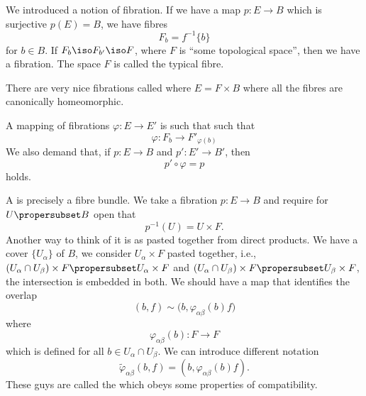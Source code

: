 
We introduced a notion of fibration. If we have a map $p\colon
E\to B$ which is surjective $p(E)=B$, we have fibres 
\begin{equation}
F_{b}=f^{-1}\{b\}
\end{equation}
for $b\in B$. If $F_{b}\iso F_{b'}\iso F$, where $F$ is ``some
topological space'', then we have a fibration. The space $F$ is
called the typical fibre.

There are very nice fibrations called 
where $E=F\times B$ where all the fibres are canonically
homeomorphic.

A mapping of fibrations $\varphi\colon E\to E'$ is such that
such that
\begin{equation}
\varphi\colon F_{b}\to F'_{\varphi(b)}
\end{equation}
We also demand that, if $p\colon E\to B$ and $p'\colon E'\to B'$,
then 
\begin{equation}
p'\circ\varphi=p
\end{equation}
holds.

A  is precisely a fibre
bundle. We take a fibration $p\colon E\to B$ and require for
$U\propersubset B$ open that
\begin{equation}
p^{-1}(U)=U\times F.
\end{equation}
Another way to think of it is as pasted together from direct
products. We have a cover $\{U_{\alpha}\}$ of $B$, we consider
$U_{\alpha}\times F$ pasted together, i.e., $(U_{\alpha}\cap
U_{\beta})\times F\propersubset U_{\alpha}\times F$ and
$(U_{\alpha}\cap
U_{\beta})\times F\propersubset U_{\beta}\times F$, the
intersection is embedded in both. We should have a map that
identifies the overlap
\begin{equation}
(b,f)\sim\bigl(b,\varphi_{\alpha\beta}(b)f\bigr)
\end{equation}
where
\begin{equation}
\varphi_{\alpha\beta}(b)\colon F\to F
\end{equation}
which is defined for all $b\in U_{\alpha}\cap U_{\beta}$. We can
introduce different notation
\begin{equation}
\widetilde{\varphi}_{\alpha\beta}(b,f) =
(b,\varphi_{\alpha\beta}(b)f).
\end{equation}
These guys are called the 
which obeys some properties of compatibility.

